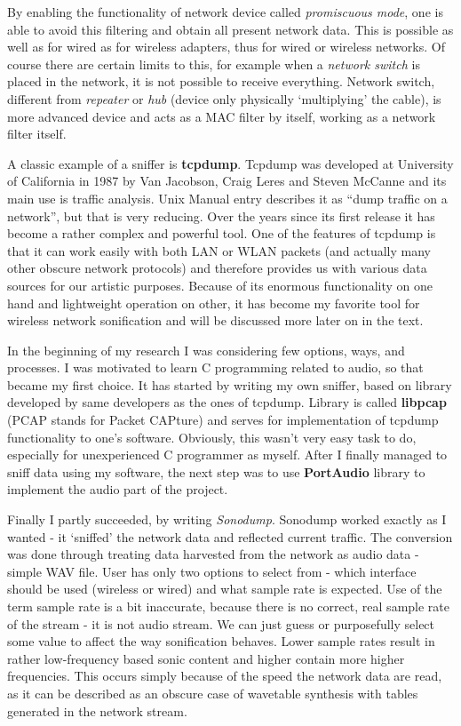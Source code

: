 \documentclass[12pt,a4paper,oneside]{report}
\begin{document}
By enabling the functionality of network device called \emph{promiscuous mode}, one is able to avoid this filtering and obtain all present network data. This is possible as well as for wired as for wireless adapters, thus for wired or wireless networks. Of course there are certain limits to this, for example when a \emph{network switch} is placed in the network, it is not possible to receive everything. Network switch, different from \emph{repeater} or \emph{hub} (device only physically `multiplying' the cable), is more advanced device and acts as a MAC filter by itself, working as a network filter itself. \cite{Pallavi2012}

A classic example of a sniffer is \textbf{tcpdump}. Tcpdump was developed at University of California in 1987 by Van Jacobson, Craig Leres and Steven McCanne and its main use is traffic analysis. Unix Manual entry describes it as ``dump traffic on a network'', but that is very reducing. Over the years since its first release it has become a rather complex and powerful tool. One of the features of tcpdump is that it can work easily with both LAN or WLAN packets (and actually many other obscure network protocols) and therefore provides us with various data sources for our artistic purposes. Because of its enormous functionality on one hand and lightweight operation on other, it has become my favorite tool for wireless network sonification and will be discussed more later on in the text.

In the beginning of my research I was considering few options, ways, and processes. I was motivated to learn C programming related to audio, so that became my first choice. It has started by writing my own sniffer, based on library developed by same developers as the ones of tcpdump. Library is called \textbf{libpcap} (PCAP stands for Packet CAPture) and serves for implementation of tcpdump functionality to one's software. Obviously, this wasn't very easy task to do, especially for unexperienced C programmer as myself. After I finally managed to sniff data using my software, the next step was to use \textbf{PortAudio} library to implement the audio part of the project.

Finally I partly succeeded, by writing \emph{Sonodump}. Sonodump worked exactly as I wanted - it `sniffed' the network data and reflected current traffic. The conversion was done through treating data harvested from the network as audio data - simple WAV file. User has only two options to select from - which interface should be used (wireless or wired) and what sample rate is expected. Use of the term sample rate is a bit inaccurate, because there is no correct, real sample rate of the stream - it is not audio stream. We can just guess or purposefully select some value to affect the way sonification behaves. Lower sample rates result in rather low-frequency based sonic content and higher contain more higher frequencies. This occurs simply because of the speed the network data are read, as it can be described as an obscure case of wavetable synthesis with tables generated in the network stream.
\end{document}
